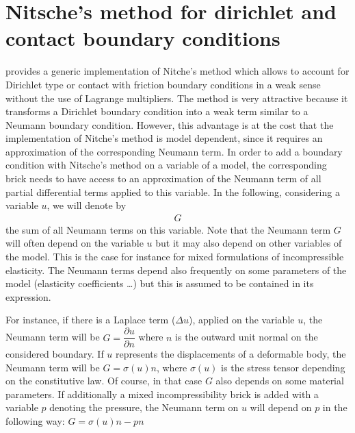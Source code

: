 \documentclass[a4paper,11pt,english]{sphinxmanual}
\begin{document}
\section{Nitsche’s method for dirichlet and contact boundary conditions}
\label{\detokenize{userdoc/model_Nitsche:nitsche-s-method-for-dirichlet-and-contact-boundary-conditions}}\label{\detokenize{userdoc/model_Nitsche:ud-model-nitsche}}\label{\detokenize{userdoc/model_Nitsche:index-0}}\label{\detokenize{userdoc/model_Nitsche::doc}}
 provides a generic implementation of Nitche’s method which allows to account for Dirichlet type or contact with friction boundary conditions in a weak sense without the use of Lagrange multipliers.
The method is very attractive because it transforms a Dirichlet boundary condition into a weak term similar to a Neumann boundary condition.
However, this advantage is at the cost that the implementation of Nitche’s method is model dependent, since it requires an approximation of the corresponding Neumann term.
In order to add a boundary condition with Nitsche’s method on a variable of a model, the corresponding brick needs to have access to an approximation of the Neumann term of all partial differential terms applied to this variable.
In the following, considering a variable \(u\), we will denote by
\begin{equation*}
\begin{split}G\end{split}
\end{equation*}
the sum of all Neumann terms on this variable.
Note that the Neumann term \(G\) will often depend on the variable \(u\) but it may also depend on other variables of the model.
This is the case for instance for mixed formulations of incompressible elasticity.
The Neumann terms depend also frequently on some parameters of the model (elasticity coefficients …) but this is assumed to be contained in its expression.

For instance, if there is a Laplace term (\(\Delta u\)), applied on the variable \(u\), the Neumann term will be \(G = \dfrac{\partial u}{\partial n}\) where \(n\) is the outward unit normal on the considered boundary.
If \(u\) represents the displacements of a deformable body, the Neumann term will be \(G = \sigma(u)n\), where \(\sigma(u)\) is the stress tensor depending on the constitutive law.
Of course, in that case \(G\) also depends on some material parameters.
If additionally a mixed incompressibility brick is added with a variable \(p\) denoting the pressure, the Neumann term on \(u\) will depend on \(p\) in the following way:
\(G = \sigma(u)n - pn\)
\end{document}
